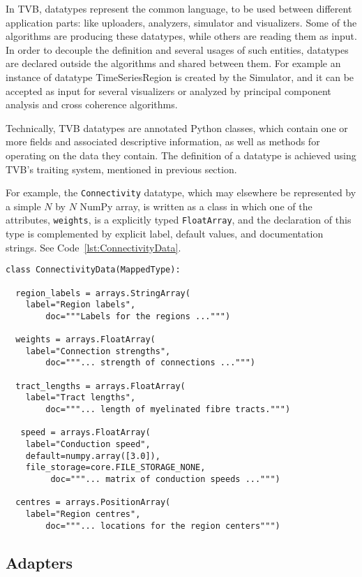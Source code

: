 \documentclass{bioinfo}
\begin{document}
In TVB, datatypes represent the common language, to be used between different
application parts: like uploaders, analyzers, simulator and visualizers.
Some of the algorithms are producing these datatypes, while others are reading
them as input.  In order to decouple the definition and several usages of such
entities, datatypes are declared outside the algorithms and shared between them.
For example an instance of datatype TimeSeriesRegion is created by the
Simulator, and it can be accepted as input for several visualizers or analyzed
by principal component analysis and cross coherence algorithms.

Technically, TVB datatypes are annotated Python classes, which
contain one or more fields and associated descriptive information, as
well as methods for operating on the data they contain. The definition of a
datatype is achieved using TVB's traiting system, mentioned in previous section.

For example, the \texttt{Connectivity} datatype, which may elsewhere
be represented by a simple $N$ by $N$ NumPy array, is written as a class
in which one of the attributes, \texttt{weights}, is a explicitly typed 
\texttt{FloatArray}, and the declaration of this type is complemented by
explicit label, default values, and documentation strings. See
Code~\ref{lst:ConnectivityData}.

\begin{lstlisting}[caption={The ConnectivityData listing},
                   label={lst:ConnectivityData}]
class ConnectivityData(MappedType):

  region_labels = arrays.StringArray( 
	label="Region labels", 
        doc="""Labels for the regions ...""")

  weights = arrays.FloatArray( 
	label="Connection strengths",
        doc="""... strength of connections ...""")

  tract_lengths = arrays.FloatArray( 
	label="Tract lengths",
        doc="""... length of myelinated fibre tracts.""")

   speed = arrays.FloatArray( 
	label="Conduction speed", 
	default=numpy.array([3.0]), 
	file_storage=core.FILE_STORAGE_NONE,
         doc="""... matrix of conduction speeds ...""")

  centres = arrays.PositionArray( 
	label="Region centres",
        doc="""... locations for the region centers""")
\end{lstlisting}

\subsection{Adapters}
\end{document}
